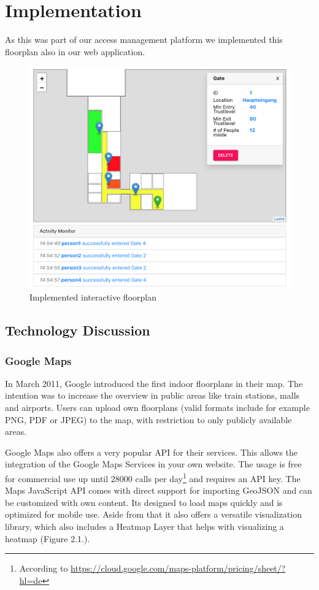 \section{Implementation}
As this was part of our access management platform we implemented this floorplan also in our web application.

\begin{figure}[!hb]
	\centering
	\includegraphics[width=0.9\linewidth]{images/FloorplanScreenshot}
	\caption{Implemented interactive floorplan}
	\label{fig:FloorplanScreenshot}
\end{figure}

\subsection{Technology Discussion}

\subsubsection{Google Maps}
\label{Google Maps}

In March 2011, Google introduced the first indoor floorplans in their map. The intention was to increase the overview in public areas like train stations, malls and airports.
Users can upload own floorplans (valid formats include for example PNG, PDF or JPEG) to the map, with restriction to only publicly available areas.

Google Maps also offers a very popular API for their services. This allows the integration of the Google Maps Services in your own website. The usage is free for commercial use up until 28000 calls per day\footnote{According to \url{https://cloud.google.com/maps-platform/pricing/sheet/?hl=de}} and requires an API key.
The Maps JavaScript API comes with direct support for importing GeoJSON and can be customized with own content. Its designed to load maps quickly and is optimized for mobile use. Aside from that it also offers a versatile visualization library, which also includes a Heatmap Layer that helps with visualizing a heatmap (Figure 2.1.).


